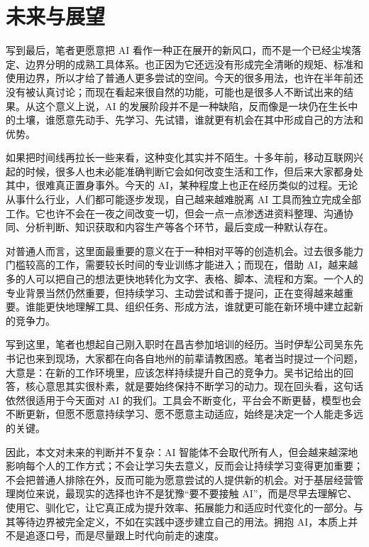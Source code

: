 \section{未来与展望}

写到最后，笔者更愿意把 AI 看作一种正在展开的新风口，而不是一个已经尘埃落定、边界分明的成熟工具体系。也正因为它还远没有形成完全清晰的规矩、标准和使用边界，所以才给了普通人更多尝试的空间。今天的很多用法，也许在半年前还没有被认真讨论；而现在看起来很自然的功能，可能也是很多人不断试出来的结果。从这个意义上说，AI 的发展阶段并不是一种缺陷，反而像是一块仍在生长中的土壤，谁愿意先动手、先学习、先试错，谁就更有机会在其中形成自己的方法和优势。

如果把时间线再拉长一些来看，这种变化其实并不陌生。十多年前，移动互联网兴起的时候，很多人也未必能准确判断它会如何改变生活和工作，但后来大家都身处其中，很难真正置身事外。今天的 AI，某种程度上也正在经历类似的过程。无论从事什么行业，人们都可能逐步发现，自己越来越难脱离 AI 工具而独立完成全部工作。它也许不会在一夜之间改变一切，但会一点一点渗透进资料整理、沟通协同、分析判断、知识获取和内容生产等各个环节，最后变成一种默认存在。

对普通人而言，这里面最重要的意义在于一种相对平等的创造机会。过去很多能力门槛较高的工作，需要较长时间的专业训练才能进入；而现在，借助 AI，越来越多的人可以把自己的想法更快地转化为文字、表格、脚本、流程和方案。一个人的专业背景当然仍然重要，但持续学习、主动尝试和善于提问，正在变得越来越重要。谁能更快地理解工具、组织任务、形成方法，谁就更可能在新环境中建立起新的竞争力。

写到这里，笔者也想起自己刚入职时在昌吉参加培训的经历。当时伊犁公司吴东先书记也来到现场，大家都在向各自地州的前辈请教困惑。笔者当时提过一个问题，大意是：在新的工作环境里，应该怎样持续提升自己的竞争力。吴书记给出的回答，核心意思其实很朴素，就是要始终保持不断学习的动力。现在回头看，这句话依然很适用于今天面对 AI 的我们。工具会不断变化，平台会不断更替，模型也会不断更新，但愿不愿意持续学习、愿不愿意主动适应，始终是决定一个人能走多远的关键。

因此，本文对未来的判断并不复杂：AI 智能体不会取代所有人，但会越来越深地影响每个人的工作方式；不会让学习失去意义，反而会让持续学习变得更加重要；不会把普通人排除在外，反而可能为愿意尝试的人提供新的机会。对于基层经营管理岗位来说，最现实的选择也许不是犹豫“要不要接触 AI”，而是尽早去理解它、使用它、驯化它，让它真正成为提升效率、拓展能力和适应时代变化的一部分。与其等待边界被完全定义，不如在实践中逐步建立自己的用法。拥抱 AI，本质上并不是追逐口号，而是尽量跟上时代向前走的速度。
